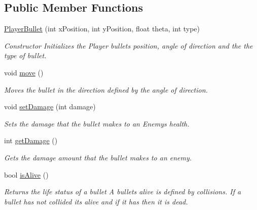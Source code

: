 \subsection*{Public Member Functions}
\begin{DoxyCompactItemize}
\item 
\mbox{\label{class_player_bullet_ab48e600824aa9c70206810e37f918d52}} 
\hyperlink{class_player_bullet_ab48e600824aa9c70206810e37f918d52}{Player\+Bullet} (int x\+Position, int y\+Position, float theta, int type)
\begin{DoxyCompactList}\small\item\em Constructor Initializes the Player bullets position, angle of direction and the the type of bullet. \end{DoxyCompactList}\item 
\mbox{\label{class_player_bullet_a8469319697d70e04399d8aaac3902c80}} 
void \hyperlink{class_player_bullet_a8469319697d70e04399d8aaac3902c80}{move} ()
\begin{DoxyCompactList}\small\item\em Moves the bullet in the direction defined by the angle of direction. \end{DoxyCompactList}\item 
void \hyperlink{class_player_bullet_a09347ab7665742fc7d492fe26c3a6bce}{set\+Damage} (int damage)
\begin{DoxyCompactList}\small\item\em Sets the damage that the bullet makes to an Enemy\textquotesingle{}s health. \end{DoxyCompactList}\item 
int \hyperlink{class_player_bullet_a55375b5c3f4f87d00daba1cda12b1e79}{get\+Damage} ()
\begin{DoxyCompactList}\small\item\em Gets the damage amount that the bullet makes to an enemy. \end{DoxyCompactList}\item 
bool \hyperlink{class_player_bullet_ab4e6b1485e9a63ddc00effc7532a9b09}{is\+Alive} ()
\begin{DoxyCompactList}\small\item\em Returns the life status of a bullet A bullets alive is defined by collisions. If a bullet has not collided its alive and if it has then it is dead. \end{DoxyCompactList}\item 

\end{DoxyCompactItemize}
